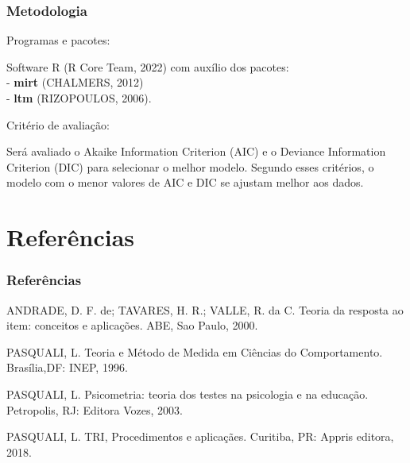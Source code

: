 \documentclass{beamer}
\begin{document}
	\begin{frame}
		
		\frametitle{Metodologia}
		\begin{center}	Programas e pacotes: \end{center}
		Software R (R Core Team, 2022) com auxílio dos pacotes: \\
		- \textbf{mirt} (CHALMERS, 2012)\\
		- \textbf{ltm} (RIZOPOULOS, 2006).\\ \pause
		
		\begin{center}	Critério de avaliação:	\end{center}
		Será avaliado o Akaike Information Criterion (AIC) e o Deviance Information Criterion (DIC)	para selecionar o melhor modelo. Segundo esses critérios, o modelo com o menor valores de AIC e DIC
		se ajustam melhor aos dados.
		
	\end{frame}
	

	
	\section{Referências}
	
	\begin{frame}
		\frametitle{Referências}
	ANDRADE, D. F. de; TAVARES, H. R.; VALLE, R. da C. Teoria da resposta ao item: conceitos e	aplicações. ABE, Sao Paulo, 2000. \newline	
	
		
	PASQUALI, L. Teoria e Método de Medida em Ciências do Comportamento. Brasília,DF: INEP, 1996.\newline
	
	PASQUALI, L. Psicometria: teoria dos testes na psicologia e na educação. Petropolis, RJ: Editora Vozes, 2003.\newline
	
	PASQUALI, L. TRI, Procedimentos e aplicaçães. Curitiba, PR: Appris editora, 2018.


	\end{frame}
	
	
	

	
\end{document}
